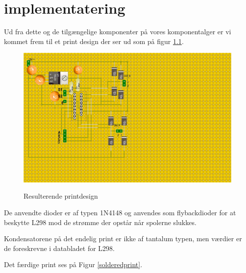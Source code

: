 \chapter{implementatering}

Ud fra dette og de tilgængelige komponenter på vores komponentalger er vi kommet frem til et print design der ser ud som på figur \ref{printdesign}.

\begin{figure}[H]
	\centering
	\caption{Resulterende printdesign}
	\includegraphics[scale=0.25,trim=0 20 500 0, clip]{billeder/printdesign}
	\label{printdesign}
\end{figure}

De anvendte dioder er af typen 1N4148 og anvendes som flybackdioder for at beskytte L298 mod de strømme der opstår når spolerne slukkes.

Kondensatorene på det endelig print er ikke af tantalum typen, men værdier er de foreskrevne i databladet for L298.

Det færdige print ses på Figur \ref{solderedprint}.

